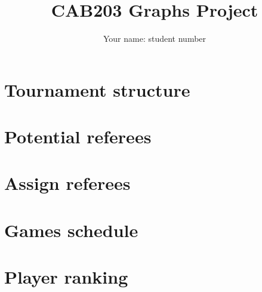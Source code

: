 \documentclass[a4paper]{article}
\author{Your name: student number}
\title{CAB203 Graphs Project}
\begin{document}
\maketitle

\section{Tournament structure}

\section{Potential referees}

\section{Assign referees}

\section{Games schedule}

\section{Player ranking}

\begin{thebibliography}{9}

\end{thebibliography}
\end{document}
